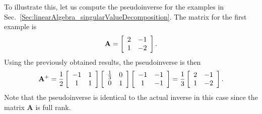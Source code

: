To illustrate this, let us compute the pseudoinverse for the examples in Sec.~\ref{Sec:linearAlgebra_singularValueDecomposition}. The matrix for the first example is
\begin{align}
  \mathbf{A} = \left[ \begin{array}{c c}
   2 & -1 \\
   1 & -2 \\ \end{array} \right] . \nonumber
\end{align}
Using the previously obtained results, the pseudoinverse is then
\begin{align}
  \mathbf{A}^+ = 
  \frac{1}{2}    \left[ \begin{array}{c c}
   -1 &  1 	\\
    1 &  1 	\\ \end{array} \right] 
  \left[ \begin{array}{c c}
    \frac{1}{3}	 	&  0 		\\
    0 				&  1		\\ \end{array} \right] 
  \left[ \begin{array}{c c}
   -1 & -1 	\\
    1 & -1 	\\ \end{array} \right] = 
  \frac{1}{3} \left[ \begin{array}{c c}
    2	 	& -1 		\\
    1 		& -2		\\ \end{array} \right] .
\end{align}
Note that the pseudoinverse is identical to the actual inverse in this case since the matrix $\mathbf{A}$ is full rank.

